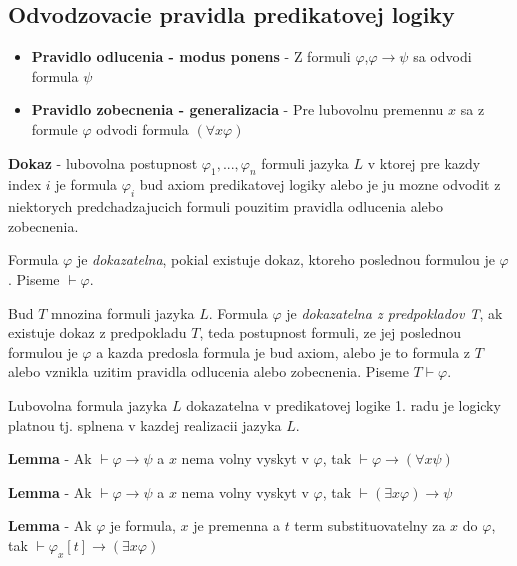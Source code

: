 \documentclass[12pt]{article}
\begin{document}
\subsection{Odvodzovacie pravidla predikatovej logiky}
\begin{itemize}
	\item \textbf{Pravidlo odlucenia - modus ponens} - Z formuli $\varphi$,$\varphi \to \psi$
		sa odvodi formula $\psi$
	\item \textbf{Pravidlo zobecnenia - generalizacia} - Pre lubovolnu premennu $x$ sa z formule
		$\varphi$ odvodi formula $(\forall x \varphi)$
\end{itemize}

\textbf{Dokaz} - lubovolna postupnost $\varphi_{1},...,\varphi_{n}$ formuli jazyka $L$ v ktorej
pre kazdy index $i$ je formula $\varphi_{i}$ bud axiom predikatovej logiky alebo je ju mozne
odvodit z niektorych predchadzajucich formuli pouzitim pravidla odlucenia alebo zobecnenia.

Formula $\varphi$ je \emph{dokazatelna}, pokial existuje dokaz, ktoreho poslednou formulou je
$\varphi$. Piseme $\vdash \varphi$.

Bud $T$ mnozina formuli jazyka $L$. Formula $\varphi$ je \emph{dokazatelna z predpokladov T}, ak
existuje dokaz z predpokladu $T$, teda postupnost formuli, ze jej poslednou formulou je $\varphi$
a kazda predosla formula je bud axiom, alebo je to formula z $T$ alebo vznikla uzitim pravidla
odlucenia alebo zobecnenia. Piseme $T \vdash \varphi$.

Lubovolna formula jazyka $L$ dokazatelna v predikatovej logike 1. radu je logicky platnou tj.
splnena v kazdej realizacii jazyka $L$.

\textbf{Lemma} - Ak $\vdash \varphi \to \psi$ a $x$ nema volny vyskyt v $\varphi$, tak
$\vdash \varphi \to (\forall x \psi)$

\textbf{Lemma} - Ak $\vdash \varphi \to \psi$ a $x$ nema volny vyskyt v $\varphi$, tak
$\vdash (\exists x \varphi) \to \psi$

\textbf{Lemma} - Ak $\varphi$ je formula, $x$ je premenna a $t$ term substituovatelny za $x$
do $\varphi$, tak $\vdash \varphi_{x}[t] \to (\exists x \varphi)$
\end{document}

